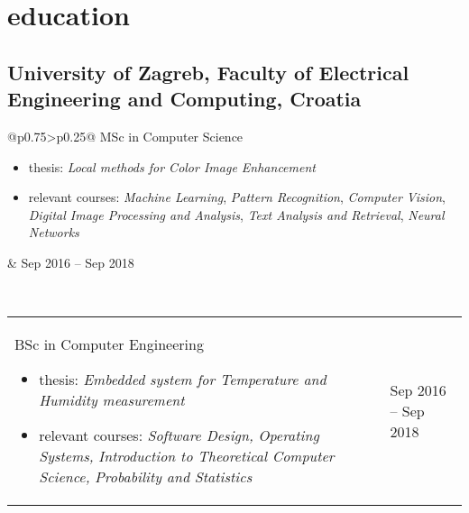 \documentclass[a4paper]{article}
\makeatletter
\newlength{\tablewidth}
\newenvironment{period}[2]{%
\newcommand{\sarma}{#2}%
\setlength{\tablewidth}{\linewidth}
\addtolength{\tablewidth}{-2\tabcolsep}
\begin{tabular}{@{}p{0.75\tablewidth}>{\raggedleft\arraybackslash}p{0.25\tablewidth}@{}}%
#1 \newline
\begin{itemize}
}{%
\end{itemize} & \sarma \\%
\end{tabular}\\
}
\makeatother
\begin{document}
\section{education}
\subsection{University of Zagreb, Faculty of Electrical Engineering and Computing, Croatia}
\begin{period}{MSc in Computer Science}{Sep 2016 -- Sep 2018}
    \item thesis:
    	\textit{Local methods for Color Image Enhancement}
    \item relevant courses:
        \textit{Machine Learning},
        \textit{Pattern Recognition},
        \textit{Computer Vision},
        \textit{Digital Image Processing and Analysis},
        \textit{Text Analysis and Retrieval},
        \textit{Neural Networks}
\end{period}
\begin{period}{BSc in Computer Engineering}{Sep 2012 -- Jul 2016}
    \item thesis:
        \textit{Embedded system for Temperature and Humidity measurement}
    \item relevant courses:
	\textit{Software Design,}
	\textit{Operating Systems,}
	\textit{Introduction to Theoretical Computer Science,}
	\textit{Probability and Statistics}
\end{period}
\end{document}
